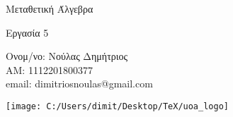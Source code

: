 \documentclass[oneside,a4paper]{article}
\newcommand {\tl}{\textlatin}
\begin{document}
	
	
	\begin{framed}	
		\begin{center}
			\huge Μεταθετική Άλγεβρα
		\end{center}
		\begin{center}
			\huge Εργασία 5
		\end{center}
		\vspace{0.3truecm}
		\begin{center}
			Ονομ/νο: Νούλας Δημήτριος\\
			ΑΜ: 1112201800377\\
			\tl{email}: \tl{dimitriosnoulas@gmail.com}
		\end{center}
		\vspace{0.3truecm}
	\end{framed}
	\vspace*{\fill}
	\begin{center}
	\texttt{[image: C:/Users/dimit/Desktop/TeX/uoa\_logo]}
	\end{center}
\vspace{1cm}
\pagebreak
\end{document}
